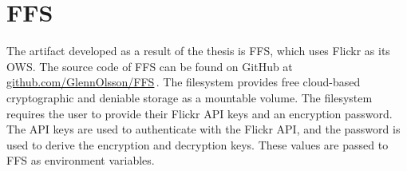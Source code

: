 \section{FFS}
\label{sec:res_ffs}
The artifact developed as a result of the thesis is \gls{FFS}, which uses Flickr as its \gls{OWS}. The source code of \gls{FFS} can be found on GitHub at \href{https://github.com/GlennOlsson/FFS}{github.com/GlennOlsson/FFS}\,\cite{olssonFejkFileSystem2022}. The filesystem provides free \mbox{cloud-based} cryptographic and deniable storage as a mountable volume. The filesystem requires the user to provide their Flickr \gls{API} keys and an encryption password. The \gls{API} keys are used to authenticate with the Flickr \gls{API}, and the password is used to derive the encryption and decryption keys. These values are passed to \gls{FFS} as environment variables.
